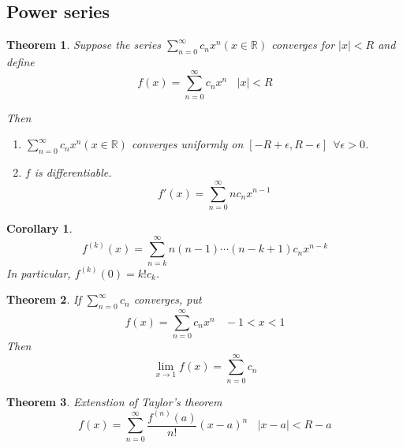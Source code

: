 \documentclass[aps,pra,onecolumn,notitlepage,superscriptaddress]{revtex4-1}
\newcommand{\R}{\mathbb{R}}
\newtheorem{theo}{Theorem}
\newtheorem{cor}{Corollary}
\begin{document}
    \subsection{Power series}
    \begin{theo}
        Suppose the series $\sum_{n=0}^\infty c_n x^n (x \in \R)$ converges for $|x| < R$ and define
        \begin{equation}
            f(x) = \sum_{n=0}^\infty c_n x^n \ \ \ \ |x| < R
        \end{equation}
        
        Then
        \begin{enumerate}
            \item $\sum_{n=0}^\infty c_n x^n (x \in \R)$ converges uniformly on $[-R+\epsilon, R-\epsilon] \ \ \forall \epsilon > 0$.

            \item $f$ is differentiable.
            \begin{equation}
                f'(x) = \sum_{n=0}^{\infty} n c_n x^{n-1}
            \end{equation}
        \end{enumerate}
    \end{theo}

    \begin{cor}
        \begin{equation}
            f^{(k)}(x) = \sum_{n=k}^{\infty} n(n-1)\cdots (n-k+1) c_n x^{n-k}
        \end{equation}
        In particular, $f^{(k)}(0) = k!c_k$.
    \end{cor}

    \begin{theo}
        If $\sum_{n=0}^{\infty} c_n$ converges, put
        \begin{equation}
            f(x) = \sum_{n=0}^\infty c_n x^n \ \ \ \ -1 < x < 1
        \end{equation}
        Then
        \begin{equation}
            \lim_{x \to 1} f(x) = \sum_{n=0}^{\infty} c_n
        \end{equation}
    \end{theo}

    \begin{theo}
        Extenstion of Taylor's theorem
        \begin{equation}
            f(x) = \sum_{n=0}^\infty \frac{f^{(n)}(a)}{n!} (x-a)^n \ \ \ \ |x-a| < R - a
        \end{equation}
    \end{theo}
\end{document}
